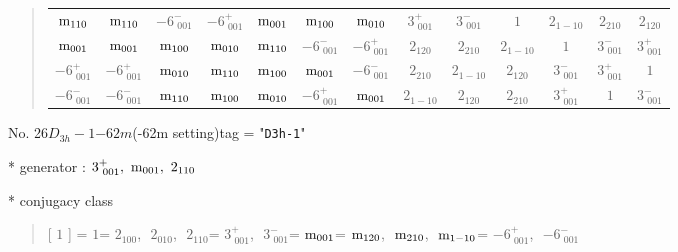\documentclass[fleqn,10pt,landscape]{jsarticle}
\begin{document}
\begin{quote}
\begin{tabular}{ccccccccccccc}
$ {\rm m}_{110} $ & $ {\rm m}_{110} $ & $ -6^{-}_{\,\,001} $ & $ -6^{+}_{\,\,001} $ & $ {\rm m}_{001} $ & $ {\rm m}_{100} $ & $ {\rm m}_{010} $ & $ 3^{+}_{\,\,001} $ & $ 3^{-}_{\,\,001} $ & $ 1 $ & $ 2{}_{1-10} $ & $ 2{}_{210} $ & $ 2{}_{120} $ \\
$ {\rm m}_{001} $ & $ {\rm m}_{001} $ & $ {\rm m}_{100} $ & $ {\rm m}_{010} $ & $ {\rm m}_{110} $ & $ -6^{-}_{\,\,001} $ & $ -6^{+}_{\,\,001} $ & $ 2{}_{120} $ & $ 2{}_{210} $ & $ 2{}_{1-10} $ & $ 1 $ & $ 3^{-}_{\,\,001} $ & $ 3^{+}_{\,\,001} $ \\
$ -6^{+}_{\,\,001} $ & $ -6^{+}_{\,\,001} $ & $ {\rm m}_{010} $ & $ {\rm m}_{110} $ & $ {\rm m}_{100} $ & $ {\rm m}_{001} $ & $ -6^{-}_{\,\,001} $ & $ 2{}_{210} $ & $ 2{}_{1-10} $ & $ 2{}_{120} $ & $ 3^{-}_{\,\,001} $ & $ 3^{+}_{\,\,001} $ & $ 1 $ \\
$ -6^{-}_{\,\,001} $ & $ -6^{-}_{\,\,001} $ & $ {\rm m}_{110} $ & $ {\rm m}_{100} $ & $ {\rm m}_{010} $ & $ -6^{+}_{\,\,001} $ & $ {\rm m}_{001} $ & $ 2{}_{1-10} $ & $ 2{}_{120} $ & $ 2{}_{210} $ & $ 3^{+}_{\,\,001} $ & $ 1 $ & $ 3^{-}_{\,\,001} $ \\
 \hline \hline
\end{tabular}
\end{quote}

\newpage

No. 26\quad$D_{3h}-1$\quad$-62m$\quad(-62m setting)\quad[ hexagonal ]
tag = "{\tt D3h-1}"

* generator : $3^{+}_{\,\,001},\,\,{\rm m}_{001},\,\,2{}_{110}$

* conjugacy class
\begin{quote}
[ $1$ ] = \quad $1$\newline[ $2{}_{100}$ ] = \quad $2{}_{100}$,\,\, $2{}_{010}$,\,\, $2{}_{110}$\newline[ $3^{+}_{\,\,001}$ ] = \quad $3^{+}_{\,\,001}$,\,\, $3^{-}_{\,\,001}$\newline[ ${\rm m}_{001}$ ] = \quad ${\rm m}_{001}$\newline[ ${\rm m}_{120}$ ] = \quad ${\rm m}_{120}$,\,\, ${\rm m}_{210}$,\,\, ${\rm m}_{1-10}$\newline[ $-6^{+}_{\,\,001}$ ] = \quad $-6^{+}_{\,\,001}$,\,\, $-6^{-}_{\,\,001}$\newline
\end{quote}
\end{document}
